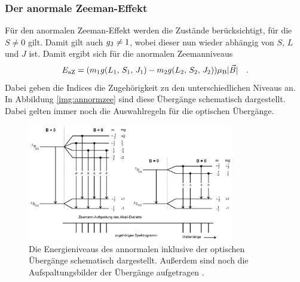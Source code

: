 \subsubsection{Der anormale Zeeman-Effekt}

\noindent
Für den anormalen Zeeman-Effekt werden die Zustände berücksichtigt, für die $S \neq 0$ gilt. 
Damit gilt auch $g_{\text{J}} \neq 1$, wobei dieser nun wieder abhängig von $S$, $L$ und $J$ ist. 
Damit ergibt sich für die anormalen Zeemanniveaus 
\begin{equation}
    E_{\text{aZ}} = (m_1 g(L_1,\, S_1,\, J_1) - m_2 g(L_2,\, S_2,\, J_2)) \mu_\text{B} |\vec{B}| \quad .
    \label{eqn:anorm}
\end{equation}
Dabei geben die Indices die Zugehörigkeit zu den unterschiedlichen Niveaus an.\\
In Abbildung \autoref{img:annormzee} sind diese Übergänge schematisch dargestellt. 
Dabei gelten immer noch die Auswahlregeln für die optischen Übergänge. 
\begin{figure}[H]
    \centering
    \includegraphics[width=0.8\textwidth]{latex/images/anormalerzeeman.PNG}
    \caption{Die Energieniveaus des annormalen inklusive der optischen Übergänge schematisch dargestellt.
    Außerdem sind noch die Aufspaltungsbilder der Übergänge aufgetragen \protect \cite{alt}.}
    \label{img:annormzee}
\end{figure}
